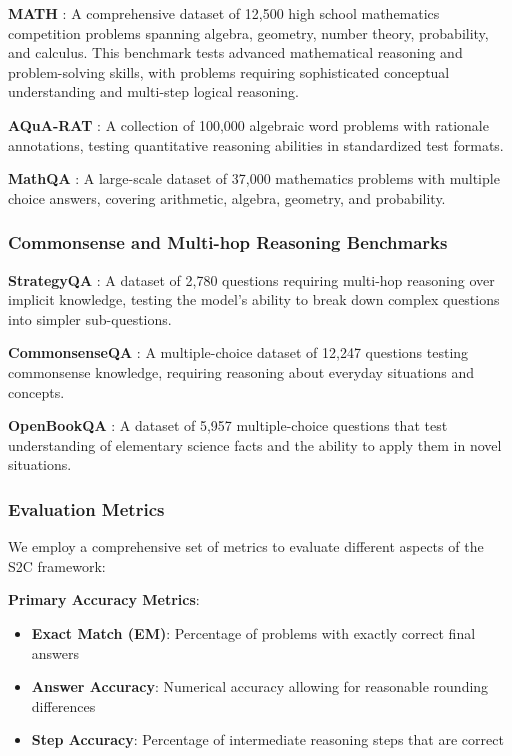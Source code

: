\documentclass[10pt,twocolumn]{article}
\newcommand{\ssc}{\textsc{S2C}}
\begin{document}
\textbf{MATH} \cite{hendrycks2021measuring}: A comprehensive dataset of 12,500 high school mathematics competition problems spanning algebra, geometry, number theory, probability, and calculus. This benchmark tests advanced mathematical reasoning and problem-solving skills, with problems requiring sophisticated conceptual understanding and multi-step logical reasoning.

\textbf{AQuA-RAT} \cite{ling2017program}: A collection of 100,000 algebraic word problems with rationale annotations, testing quantitative reasoning abilities in standardized test formats.

\textbf{MathQA} \cite{amini2019mathqa}: A large-scale dataset of 37,000 mathematics problems with multiple choice answers, covering arithmetic, algebra, geometry, and probability.

\subsubsection{Commonsense and Multi-hop Reasoning Benchmarks}

\textbf{StrategyQA} \cite{geva2021did}: A dataset of 2,780 questions requiring multi-hop reasoning over implicit knowledge, testing the model's ability to break down complex questions into simpler sub-questions.

\textbf{CommonsenseQA} \cite{talmor2018commonsenseqa}: A multiple-choice dataset of 12,247 questions testing commonsense knowledge, requiring reasoning about everyday situations and concepts.

\textbf{OpenBookQA} \cite{mihaylov2018can}: A dataset of 5,957 multiple-choice questions that test understanding of elementary science facts and the ability to apply them in novel situations.

\subsubsection{Evaluation Metrics}

We employ a comprehensive set of metrics to evaluate different aspects of the \ssc{} framework:

\textbf{Primary Accuracy Metrics}:
\begin{itemize}[leftmargin=*]
\item \textbf{Exact Match (EM)}: Percentage of problems with exactly correct final answers
\item \textbf{Answer Accuracy}: Numerical accuracy allowing for reasonable rounding differences
\item \textbf{Step Accuracy}: Percentage of intermediate reasoning steps that are correct
\end{itemize}
\end{document}
